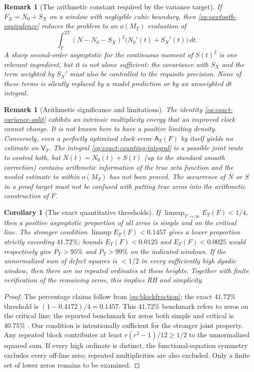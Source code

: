 \documentclass[11pt,reqno]{amsart}
\numberwithin{equation}{section}
\newtheorem{corollary}[theorem]{Corollary}
\newtheorem{remark}[theorem]{Remark}
\begin{document}
\begin{remark}[The arithmetic constant required by the variance target]
\label{rem:second-order-constant}
If $F_X=N_0+S_X$ on a window with negligible cubic boundary,
then \eqref{eq:sawtooth-equivalence} reduces the problem to an
$o(M_T)$ evaluation of
\[
 \int_T^{2T}(N-N_0-S_X)^2\bigl(N_0'(t)+S_X'(t)\bigr)\,dt.
\]
A sharp second-order asymptotic for the continuous moment of
$S(t)^2$ is one relevant ingredient, but it is \emph{not}
alone sufficient: the covariance with $S_X$ and the term
weighted by $S_X'$ must also be controlled to the requisite
precision.  None of these terms is silently replaced by a
model prediction or by an unweighted $dt$ integral.
\end{remark}

\begin{remark}[Arithmetic significance and limitations]
\label{rem:variance-significance}
The identity \eqref{eq:exact-variance-split} exhibits an
\emph{intrinsic multiplicity energy} that an improved clock
cannot change. It is not known here to have a positive limiting
density. Conversely, even a perfectly optimized clock error
$\mathsf A_T(F)$ by itself yields no estimate on $\mathsf V_T$.
The integral \eqref{eq:exact-counting-integral} is a possible
joint route to control both, but $N(t)=N_0(t)+S(t)$ (up to the
standard smooth correction) contains arithmetic information of
the \emph{true} zeta function and the needed estimate to within
$o(M_T)$ has not been proved.  The occurrence of $N$ or $S$
in a \emph{proof target} must not be confused with putting
true zeros into the arithmetic construction of $F$.
\end{remark}

\begin{corollary}[The exact quantitative thresholds]
\label{cor:thresholds}
If $\limsup_{T\to\infty}E_T(F)<1/4$, then a positive asymptotic
proportion of all zeros is simple and on the critical line.  The stronger
condition $\limsup E_T(F)<0.1457$ gives a lower proportion strictly
exceeding $41.72\%$; bounds $E_T(F)<0.0125$ and $E_T(F)<0.0025$
would respectively give $P_T>95\%$ and $P_T>99\%$ on the indicated
windows.  If the \emph{unnormalized} sum of defect squares is $<1/2$
in every sufficiently high dyadic window, then there are no repeated
ordinates at those heights.  Together with finite verification of the
remaining zeros, this implies RH and simplicity.
\end{corollary}
\begin{proof}
The percentage claims follow from \eqref{eq:blockfraction}; the exact
$41.72\%$ threshold is $(1-0.4172)/4=0.1457$.  This $41.72\%$ benchmark refers to zeros on the critical line; the
reported benchmark for zeros both simple and critical is $40.75\%$
\cite{BaluyotEtAl2025}.  Our condition is intentionally sufficient
for the stronger joint property.  Any repeated block
contributes at least $r(r^2-1)/12\ge1/2$ to the unnormalized squared
sum.  If every high ordinate is distinct, the functional-equation
symmetry excludes every off-line zero; repeated multiplicities are also
excluded.  Only a finite set of lower zeros remains to be examined.
\end{proof}
\end{document}
